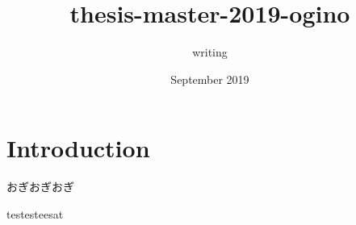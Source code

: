 \documentclass{article}
\title{thesis-master-2019-ogino}
\author{writing }
\date{September 2019}
\begin{document}
\maketitle

\section{Introduction}

おぎおぎおぎ

testesteesat
\end{document}
